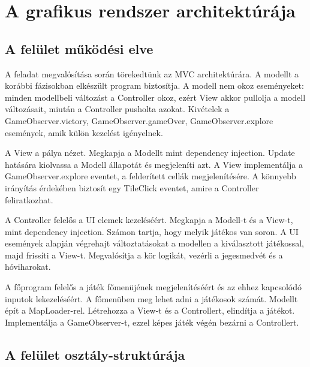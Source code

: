 \section{A grafikus rendszer architektúrája}

\subsection{A felület működési elve}

A feladat megvalósítása során törekedtünk az MVC architektúrára. A modellt a korábbi fázisokban elkészült program biztosítja. A modell nem okoz eseményeket: minden modellbeli változást a Controller okoz, ezért View akkor pullolja a modell változásait, miután a Controller pusholta azokat. Kivételek a GameObserver.victory, GameObserver.gameOver, GameObserver.explore események, amik külön kezelést igényelnek.

A View a pálya nézet. Megkapja a Modellt mint dependency injection. Update hatására kiolvassa a Modell állapotát és megjeleníti azt. A View implementálja a GameObserver.explore eventet, a felderített cellák megjelenítésére. A könnyebb irányítás érdekében biztosít egy TileClick eventet, amire a Controller feliratkozhat.

A Controller felelős a UI elemek kezeléséért. Megkapja a Modell-t és a View-t, mint dependency injection. Számon tartja, hogy melyik játékos van soron. A UI események alapján végrehajt változtatásokat a modellen a kiválasztott játékossal, majd frissíti a View-t. Megvalósítja a kör logikát, vezérli a jegesmedvét és a hóviharokat.

A főprogram felelős a játék főmenüjének megjelenítéséért és az ehhez kapcsolódó inputok lekezeléséért. A főmenüben meg lehet adni a játékosok számát. Modellt épít a MapLoader-rel. Létrehozza a View-t és a Controllert, elindítja a játékot. Implementálja a GameObserver-t, ezzel képes játék végén bezárni a Controllert.
\subsection{A felület osztály-struktúrája}

